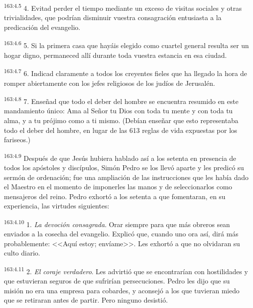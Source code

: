 \par 
\textsuperscript{163:4.5} 4. Evitad perder el tiempo mediante un exceso de visitas sociales y otras trivialidades, que podrían disminuir vuestra consagración entusiasta a la predicación del evangelio.

\par 
\textsuperscript{163:4.6} 5. Si la primera casa que hayáis elegido como cuartel general resulta ser un hogar digno, permaneced allí durante toda vuestra estancia en esa ciudad.

\par 
\textsuperscript{163:4.7} 6. Indicad claramente a todos los creyentes fieles que ha llegado la hora de romper abiertamente con los jefes religiosos de los judíos de Jerusalén.

\par 
\textsuperscript{163:4.8} 7. Enseñad que todo el deber del hombre se encuentra resumido en este mandamiento único: Ama al Señor tu Dios con toda tu mente y con toda tu alma, y a tu prójimo como a ti mismo. (Debían enseñar que esto representaba todo el deber del hombre, en lugar de las 613 reglas de vida expuestas por los fariseos.)

\par 
\textsuperscript{163:4.9} Después de que Jesús hubiera hablado así a los setenta en presencia de todos los apóstoles y discípulos, Simón Pedro se los llevó aparte y les predicó su sermón de ordenación; fue una ampliación de las instrucciones que les había dado el Maestro en el momento de imponerles las manos y de seleccionarlos como mensajeros del reino. Pedro exhortó a los setenta a que fomentaran, en su experiencia, las virtudes siguientes:

\par 
\textsuperscript{163:4.10} 1. \textit{La devoción consagrada}. Orar siempre para que más obreros sean enviados a la cosecha del evangelio. Explicó que, cuando uno ora así, dirá más probablemente: <<Aquí estoy; envíame>>. Les exhortó a que no olvidaran su culto diario.

\par 
\textsuperscript{163:4.11} 2. \textit{El coraje verdadero}. Les advirtió que se encontrarían con hostilidades y que estuvieran seguros de que sufrirían persecuciones. Pedro les dijo que su misión no era una empresa para cobardes, y aconsejó a los que tuvieran miedo que se retiraran antes de partir. Pero ninguno desistió.

